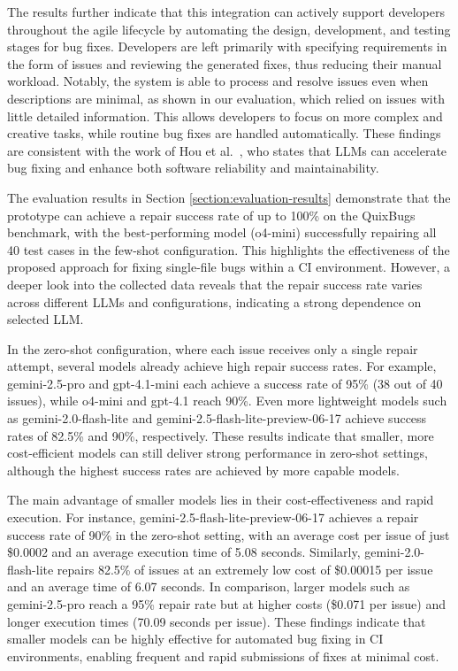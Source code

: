 The results further indicate that this integration can actively support developers throughout the agile lifecycle by automating the design, development, and testing stages for bug fixes. Developers are left primarily with specifying requirements in the form of issues and reviewing the generated fixes, thus reducing their manual workload. Notably, the system is able to process and resolve issues even when descriptions are minimal, as shown in our evaluation, which relied on issues with little detailed information. This allows developers to focus on more complex and creative tasks, while routine bug fixes are handled automatically. These findings are consistent with the work of Hou et al.~\cite{houLargeLanguageModels2024}, who states that \acp{LLM} can accelerate bug fixing and enhance both software reliability and maintainability.

The evaluation results in Section \ref{section:evaluation-results} demonstrate that the prototype can achieve a repair success rate of up to 100\% on the QuixBugs benchmark, with the best-performing model (o4-mini) successfully repairing all 40 test cases in the few-shot configuration. This highlights the effectiveness of the proposed approach for fixing single-file bugs within a CI environment. However, a deeper look into the collected data reveals that the repair success rate varies across different \acp{LLM} and configurations, indicating a strong dependence on selected \ac{LLM}.

In the zero-shot configuration, where each issue receives only a single repair attempt, several models already achieve high repair success rates. For example, gemini-2.5-pro and gpt-4.1-mini each achieve a success rate of 95\% (38 out of 40 issues), while o4-mini and gpt-4.1 reach 90\%. Even more lightweight models such as gemini-2.0-flash-lite and gemini-2.5-flash-lite-preview-06-17 achieve success rates of 82.5\% and 90\%, respectively. These results indicate that smaller, more cost-efficient models can still deliver strong performance in zero-shot settings, although the highest success rates are achieved by more capable models.

The main advantage of smaller models lies in their cost-effectiveness and rapid execution. For instance, gemini-2.5-flash-lite-preview-06-17 achieves a repair success rate of 90\% in the zero-shot setting, with an average cost per issue of just \$0.0002 and an average execution time of 5.08 seconds. Similarly, gemini-2.0-flash-lite repairs 82.5\% of issues at an extremely low cost of \$0.00015 per issue and an average time of 6.07 seconds. In comparison, larger models such as gemini-2.5-pro reach a 95\% repair rate but at higher costs (\$0.071 per issue) and longer execution times (70.09 seconds per issue). These findings indicate that smaller models can be highly effective for automated bug fixing in CI environments, enabling frequent and rapid submissions of fixes at minimal cost.

